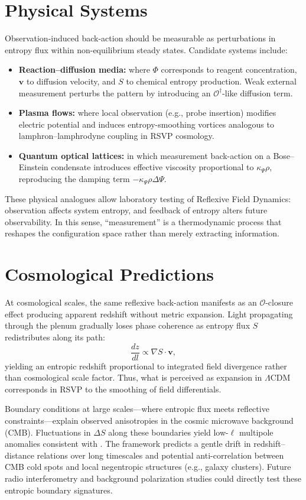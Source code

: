 \documentclass[12pt]{book}
\theoremstyle{definition}
\begin{document}
\section{Physical Systems}
Observation-induced back-action should be measurable as perturbations in entropy flux within non-equilibrium steady states.  
Candidate systems include:
\begin{itemize}
  \item \textbf{Reaction–diffusion media:} where $\Phi$ corresponds to reagent concentration, $\mathbf{v}$ to diffusion velocity, and $S$ to chemical entropy production. Weak external measurement perturbs the pattern by introducing an $\mathcal{O}^\dagger$-like diffusion term.
  \item \textbf{Plasma flows:} where local observation (e.g., probe insertion) modifies electric potential and induces entropy-smoothing vortices analogous to lamphron–lamphrodyne coupling in RSVP cosmology.
  \item \textbf{Quantum optical lattices:} in which measurement back-action on a Bose–Einstein condensate introduces effective viscosity proportional to $\kappa_\Psi \rho$, reproducing the damping term $-\kappa_\Psi \rho \Delta \Psi$.
\end{itemize}

These physical analogues allow laboratory testing of Reflexive Field Dynamics: observation affects system entropy, and feedback of entropy alters future observability.  
In this sense, ``measurement'' is a thermodynamic process that reshapes the configuration space rather than merely extracting information.

\section{Cosmological Predictions}
At cosmological scales, the same reflexive back-action manifests as an $\mathcal{O}$-closure effect producing apparent redshift without metric expansion.  
Light propagating through the plenum gradually loses phase coherence as entropy flux $S$ redistributes along its path:
\begin{equation}
\frac{dz}{dl} \propto \nabla S \cdot \mathbf{v},
\end{equation}
yielding an entropic redshift proportional to integrated field divergence rather than cosmological scale factor.  
Thus, what is perceived as expansion in $\Lambda$CDM corresponds in RSVP to the smoothing of field differentials.

Boundary conditions at large scales---where entropic flux meets reflective constraints---explain observed anisotropies in the cosmic microwave background (CMB).  
Fluctuations in $\Delta S$ along these boundaries yield low-$\ell$ multipole anomalies consistent with \cite{gibbs2025entropic}.  
The framework predicts a gentle drift in redshift–distance relations over long timescales and potential anti-correlation between CMB cold spots and local negentropic structures (e.g., galaxy clusters).  
Future radio interferometry and background polarization studies could directly test these entropic boundary signatures.
\end{document}
